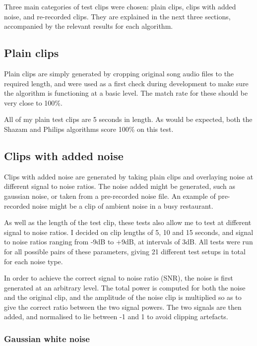 \documentclass[12pt,a4paper,twoside,openright]{report}
\begin{document}
Three main categories of test clips were chosen: plain clips, clips with added noise, and re-recorded clips. They are explained in the next three sections, accompanied by the relevant results for each algorithm.


\subsection{Plain clips}

Plain clips are simply generated by cropping original song audio files to the required length, and were used as a first check during development to make sure the algorithm is functioning at a basic level. The match rate for these should be very close to 100\%.

All of my plain test clips are 5 seconds in length. As would be expected, both the Shazam and Philips algorithms score 100\% on this test.


\subsection{Clips with added noise}

Clips with added noise are generated by taking plain clips and overlaying noise at different signal to noise ratios. The noise added might be generated, such as gaussian noise, or taken from a pre-recorded noise file. An example of pre-recorded noise might be a clip of ambient noise in a busy restaurant.

As well as the length of the test clip, these tests also allow me to test at different signal to noise ratios. I decided on clip lengths of 5, 10 and 15 seconds, and signal to noise ratios ranging from -9dB to +9dB, at intervals of 3dB. All tests were run for all possible pairs of these parameters, giving 21 different test setups in total for each noise type. 

In order to achieve the correct signal to noise ratio (SNR), the noise is first generated at an arbitrary level. The total power is computed for both the noise and the original clip, and the amplitude of the noise clip is multiplied so as to give the correct ratio between the two signal powers. The two signals are then added, and normalised to lie between -1 and 1 to avoid clipping artefacts.


\subsubsection{Gaussian white noise}
\end{document}
